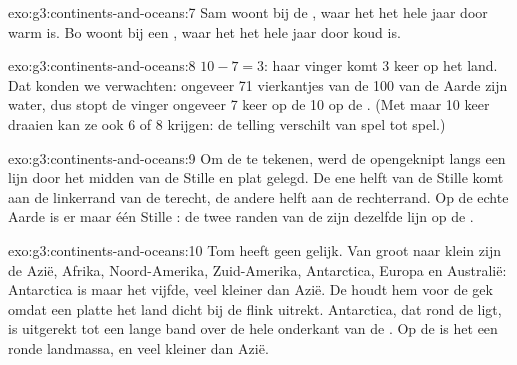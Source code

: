 \begin{solution}{exo:g3:continents-and-oceans:7}
Sam woont bij de , waar het het hele jaar door warm is. Bo woont bij
een , waar het het hele jaar door koud is.
\end{solution}

\begin{solution}{exo:g3:continents-and-oceans:8}
$10 - 7 = 3$: haar vinger komt 3 keer op het land. Dat konden we
verwachten: ongeveer 71 vierkantjes van de 100 van de Aarde zijn water, dus
stopt de vinger ongeveer 7 keer op de 10 op de . (Met maar 10 keer
draaien kan ze ook 6 of 8 krijgen: de telling verschilt van spel tot spel.)
\end{solution}

\begin{solution}{exo:g3:continents-and-oceans:9}
Om de  te tekenen, werd de  opengeknipt langs een lijn door
het midden van de Stille  en plat gelegd. De ene helft van de Stille
 komt aan de linkerrand van de  terecht, de andere helft aan de
rechterrand. Op de echte Aarde is er maar één Stille : de twee randen
van de  zijn dezelfde lijn op de .
\end{solution}

\begin{solution}{exo:g3:continents-and-oceans:10}
Tom heeft geen gelijk. Van groot naar klein zijn de  Azië,
Afrika, Noord-Amerika, Zuid-Amerika, Antarctica, Europa en Australië:
Antarctica is maar het vijfde, veel kleiner dan Azië. De  houdt
hem voor de gek omdat een platte  het land dicht bij de  flink
uitrekt. Antarctica, dat rond de  ligt, is uitgerekt tot een lange
band over de hele onderkant van de . Op de  is het een ronde
landmassa, en veel kleiner dan Azië.
\end{solution}
